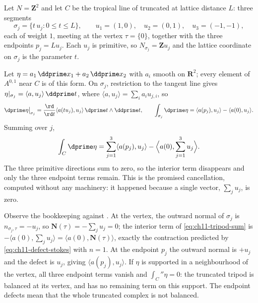 \begin{example}
\label{ex:ch11-tripod-stokes}
Let $N=\mathbf Z^2$ and let $C$ be the tropical line of
 truncated at lattice distance $L$: three
segments
\[
 \sigma_j=\{t\,u_j: 0\le t\le L\},
 \qquad
 u_1=(1,0),\quad u_2=(0,1),\quad u_3=(-1,-1),
\]
each of weight $1$, meeting at the vertex $\tau=\{0\}$, together with the
three endpoints $p_j=Lu_j$.  Each $u_j$ is primitive, so
$N_{\sigma_j}=\mathbf Zu_j$ and the lattice coordinate on $\sigma_j$ is the
parameter $t$.

Let $\eta=a_1\,\ddprime x_1+a_2\,\ddprime x_2$ with $a_i$ smooth on
$\mathbf R^2$; every element of $A^{0,1}$ near $C$ is of this form.  On
$\sigma_j$, restriction to the tangent line gives
$\eta|_{\sigma_j}=\langle a,u_j\rangle\,\ddprime t$, where
$\langle a,u_j\rangle=\sum_ia_iu_{j,i}$, so
\[
 \dprime\eta\big|_{\sigma_j}
 =\frac{\rd}{\rd t}\langle a(tu_j),u_j\rangle\,\dprime t\wedge\ddprime t,
 \qquad
 \int_{\sigma_j}\dprime\eta
 =\langle a(p_j),u_j\rangle-\langle a(0),u_j\rangle .
\]
Summing over $j$,
\begin{equation}
\label{eq:ch11-tripod-sum}
 \int_C\dprime\eta
 =\sum_{j=1}^3\langle a(p_j),u_j\rangle
  -\Bigl\langle a(0),\sum_{j=1}^3u_j\Bigr\rangle .
\end{equation}
The three primitive directions sum to zero, so the interior term
disappears and only the three endpoint terms remain.  This is the promised
cancellation, computed without any machinery: it happened because a single
vector, $\sum_ju_j$, is zero.

Observe the bookkeeping against
.  At the vertex, the outward normal of
$\sigma_j$ is $n_{\sigma_j,\tau}=-u_j$, so
$\mathbf N(\tau)=-\sum_ju_j=0$; the interior term of
\eqref{eq:ch11-tripod-sum} is $-\langle a(0),\sum_ju_j\rangle
=\langle a(0),\mathbf N(\tau)\rangle$, exactly the contraction predicted by
\eqref{eq:ch11-defect-stokes} with $n=1$.  At the endpoint $p_j$ the
outward normal is $+u_j$ and the defect is $u_j$, giving
$\langle a(p_j),u_j\rangle$.  If $\eta$ is supported in a neighbourhood of
the vertex, all three endpoint terms vanish and $\int_C\dprime\eta=0$: the
truncated tripod is balanced at its vertex, and
 has no remaining term on this support.
The endpoint defects mean that the whole truncated complex is not balanced.
\end{example}

